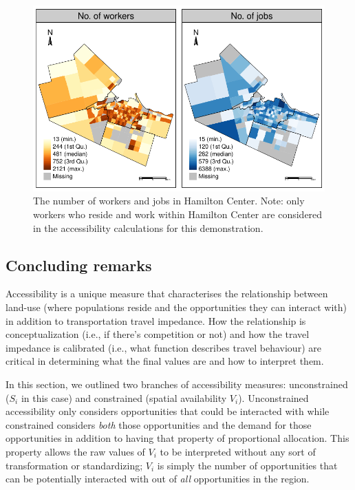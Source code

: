 \documentclass[12pt, oneside]{report}
\begin{document}
\begin{figure}

{\centering \includegraphics{tools-report_files/figure-pdf/fig-worker-job-plot-1.pdf}

}

\caption{\label{fig-worker-job-plot}The number of workers and jobs in
Hamilton Center. Note: only workers who reside and work within Hamilton
Center are considered in the accessibility calculations for this
demonstration.}

\end{figure}

\hypertarget{concluding-remarks}{%
\subsection{Concluding remarks}\label{concluding-remarks}}

Accessibility is a unique measure that characterises the relationship
between land-use (where populations reside and the opportunities they
can interact with) in addition to transportation travel impedance. How
the relationship is conceptualization (i.e., if there's competition or
not) and how the travel impedance is calibrated (i.e., what function
describes travel behaviour) are critical in determining what the final
values are and how to interpret them.

In this section, we outlined two branches of accessibility measures:
unconstrained (\(S_i\) in this case) and constrained (spatial
availability \(V_i\)). Unconstrained accessibility only considers
opportunities that could be interacted with while constrained considers
\emph{both} those opportunities and the demand for those opportunities
in addition to having that property of proportional allocation. This
property allows the raw values of \(V_i\) to be interpreted without any
sort of transformation or standardizing; \(V_i\) is simply the number of
opportunities that can be potentially interacted with out of \emph{all}
opportunities in the region.
\end{document}
